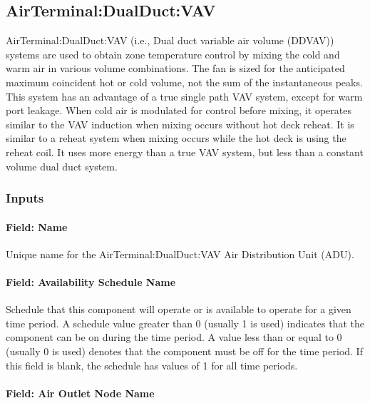 \subsection{AirTerminal:DualDuct:VAV}\label{airterminaldualductvav}

AirTerminal:DualDuct:VAV (i.e., Dual duct variable air volume (DDVAV)) systems are used to obtain zone temperature control by mixing the cold and warm air in various volume combinations. The fan is sized for the anticipated maximum coincident hot or cold volume, not the sum of the instantaneous peaks. This system has an advantage of a true single path VAV system, except for warm port leakage. When cold air is modulated for control before mixing, it operates similar to the VAV induction when mixing occurs without hot deck reheat. It is similar to a reheat system when mixing occurs while the hot deck is using the reheat coil. It uses more energy than a true VAV system, but less than a constant volume dual duct system.

\subsubsection{Inputs}\label{inputs-15-000}

\paragraph{Field: Name}\label{field-name-15}

Unique name for the AirTerminal:DualDuct:VAV Air Distribution Unit (ADU).

\paragraph{Field: Availability Schedule Name}\label{field-availability-schedule-name-12}

Schedule that this component will operate or is available to operate for a given time period. A schedule value greater than 0 (usually 1 is used) indicates that the component can be on during the time period. A value less than or equal to 0 (usually 0 is used) denotes that the component must be off for the time period. If this field is blank, the schedule has values of 1 for all time periods.

\paragraph{Field: Air Outlet Node Name}\label{field-air-outlet-node-name-8}

